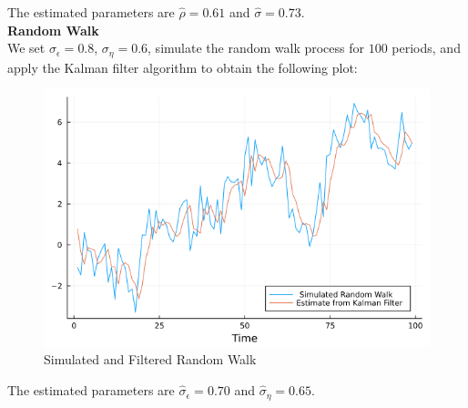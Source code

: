 \documentclass{article}
\begin{document}
	The estimated parameters are $\hat{\rho} = 0.61$ and $\hat{\sigma} = 0.73$. \\
	
	\noindent\textbf{\large Random Walk} \\
	
	We set $\sigma_{\epsilon} = 0.8$, $\sigma_\eta = 0.6$, simulate the random walk process for $100$ periods, and apply the Kalman filter algorithm to obtain the following plot:
	
	\begin{figure}[htbp]
		\centering
		\includegraphics[scale=0.5]{RW.png}
		\caption{Simulated and Filtered Random Walk}
	\end{figure} 
	
	The estimated parameters are $\hat{\sigma}_{\epsilon} = 0.70$ and $\hat{\sigma}_{\eta} = 0.65$. \\
 	
\end{document}
